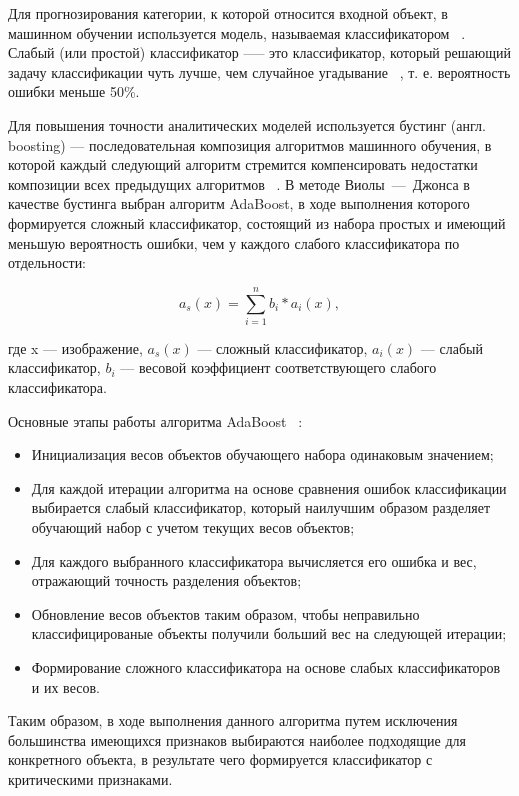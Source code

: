 \begin{enumerate}[label=\arabic*.]
    Для прогнозирования категории, к которой относится входной объект, в машинном обучении используется модель, называемая классификатором ~\cite{classifier}. Слабый (или простой) классификатор —-- это классификатор, который решающий задачу классификации чуть лучше, чем случайное угадывание ~\cite{weak}, т. е. вероятность ошибки меньше 50\%. 

    Для повышения точности аналитических моделей используется бустинг (англ. boosting) --- последовательная композиция алгоритмов машинного обучения, в которой каждый следующий алгоритм стремится компенсировать недостатки композиции всех предыдущих алгоритмов ~\cite{tomsk}. 
    В методе Виолы~---~Джонса в качестве бустинга выбран алгоритм AdaBoost, в ходе выполнения которого формируется сложный классификатор, состоящий из набора простых и имеющий меньшую вероятность ошибки, чем у каждого слабого классификатора по отдельности:

    \begin{equation}
        a_s(x) = \sum_{i=1}^{n}b_i * a_i(x),
    \end{equation}

    где x --- изображение, $a_s(x)$ --- сложный классификатор, $a_i(x)$ --- слабый классификатор, $b_i$ --- весовой коэффициент соответствующего слабого классификатора.

    Основные этапы работы алгоритма AdaBoost ~\cite{viola}:

    \begin{itemize}
        \item Инициализация весов объектов обучающего набора одинаковым значением;
        \item Для каждой итерации алгоритма на основе сравнения ошибок классификации выбирается слабый классификатор, который наилучшим образом разделяет обучающий набор с учетом текущих весов объектов;
        \item Для каждого выбранного классификатора вычисляется его ошибка и вес, отражающий точность разделения объектов;
        \item Обновление весов объектов таким образом, чтобы неправильно классифицированые объекты получили больший вес на следующей итерации;
        \item Формирование сложного классификатора на основе слабых классификаторов и их весов.
    \end{itemize}
    
    Таким образом, в ходе выполнения данного алгоритма путем исключения большинства имеющихся признаков выбираются наиболее подходящие для конкретного объекта, в результате чего формируется классификатор с критическими признаками.


\end{enumerate}
